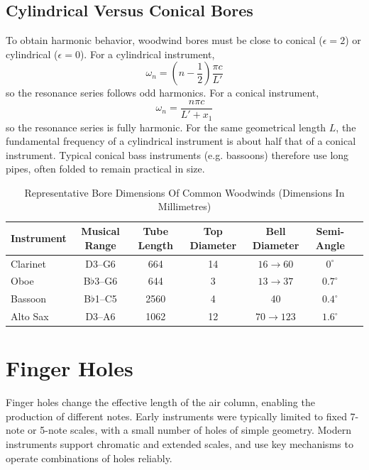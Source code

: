 \subsection{Cylindrical Versus Conical Bores}

To obtain harmonic behavior, woodwind bores must be close to conical (\( \epsilon = 2 \)) or cylindrical (\( \epsilon = 0 \)). For a cylindrical instrument,
\[
\omega_n = \left(n - \frac{1}{2}\right)\frac{\pi c}{L'}
\]
so the resonance series follows odd harmonics. For a conical instrument,
\[
\omega_n = \frac{n\pi c}{L' + x_{1}}
\]
so the resonance series is fully harmonic. For the same geometrical length \( L \), the fundamental frequency of a cylindrical instrument is about half that of a conical instrument. Typical conical bass instruments (e.g. bassoons) therefore use long pipes, often folded to remain practical in size. 

\begin{table}[!htb]
\centering
\begin{tabular}{lcccccc}
\hline
Instrument  & Musical Range     & Tube Length   & Top Diameter  & Bell Diameter             & Semi-Angle        \\
\hline
Clarinet    & D3--G6            & 664           & 14            & \(16 \rightarrow 60\)     & \(0^{\circ}\)     \\
Oboe        & B\(\flat\)3--G6   & 644           & 3             & \(13 \rightarrow 37\)     & \(0.7^{\circ}\)   \\
Bassoon     & B\(\flat\)1--C5   & 2560          & 4             & 40                        & \(0.4^{\circ}\)   \\
Alto Sax    & D3--A6            & 1062          & 12            & \(70 \rightarrow 123\)    & \(1.6^{\circ}\)   \\
\hline
\end{tabular}
\caption{Representative Bore Dimensions Of Common Woodwinds (Dimensions In Millimetres)}
\end{table}

\section{Finger Holes}

Finger holes change the effective length of the air column, enabling the production of different notes. Early instruments were typically limited to fixed 7-note or 5-note scales, with a small number of holes of simple geometry. Modern instruments support chromatic and extended scales, and use key mechanisms to operate combinations of holes reliably. 


